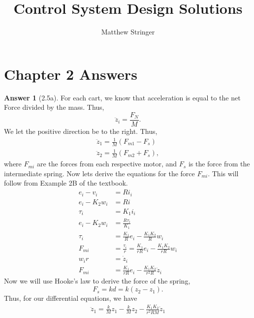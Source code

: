 \documentclass{article}
\title{Control System Design Solutions}
\author{Matthew Stringer}
\date{}
\theoremstyle{definition}
\newtheorem*{ans}{Answer}
\begin{document}
    \maketitle

    \section*{Chapter 2 Answers}
    \begin{ans}[2.5a]
        For each cart, we know that acceleration is equal to the net Force 
        divided by the mass. Thus,
        \begin{equation*}
            \ddot z_i = \frac{F_N}{M}.
        \end{equation*}
        We let the positive direction be to the right.
        Thus, 
        \begin{align*}
            \ddot z_1 = \frac{1}{M} \left( F_{m1} - F_s \right) \\
            \ddot z_2 = \frac{1}{M} \left( F_{m2} + F_s \right),
        \end{align*}
        where $F_{mi}$ are the forces from each respective motor, and
        $F_s$ is the force from the intermediate spring.
        Now lets derive the equations for the force $F_{mi}$.
        This will follow from Example 2B of the textbook.
        \begin{align*}
            e_i - v_i &= Ri_i \\
            e_i - K_2 w_i &= Ri \\
            \tau_i &= K_1 i_i \\
            e_i - K_2 w_i &= \frac{R\tau_i}{K_1} \\
            \tau_i &= \frac{K_1}{R}e_i - \frac{K_1 K_2}{R}w_i \\
            F_{mi} &= \frac{\tau_i}{r} = \frac{K_1}{rR}e_i - \frac{K_1 K_2}{rR}w_i \\
            w_i r &= \dot z_i \\
            F_{mi} &= \frac{K_1}{rR}e_i - \frac{K_1 K_2}{r^2 R}\dot z_i
        \end{align*}
        Now we will use Hooke's law to derive the force of the spring,
        \begin{equation*}
            F_s = kd = k(z_2 - z_1).
        \end{equation*}
        Thus, for our differential equations, we have
        \begin{align*}
            \ddot z_1 = \frac{k}{M} z_1 - \frac{k}{M}z_2 
            - \frac{K_1 K_2}{r^2 R M}\dot z_1 

\end{align*}
\end{ans}
\end{document}
